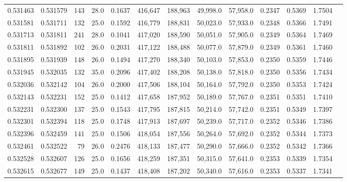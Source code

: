 \begin{tabular}{rrrrrrrrrrrrr}
0.531463 & 0.531579 &   143 & 28.0 &                                     0.1637 & 416,647 & 188,963 &  49,998.0 &  57,958.0 & 0.2347 & 0.5369 & 1.7504 \\
0.531581 & 0.531711 &   132 & 25.0 &                                     0.1592 & 416,779 & 188,831 &  50,023.0 &  57,933.0 & 0.2348 & 0.5366 & 1.7491 \\
0.531713 & 0.531811 &   241 & 28.0 &                                     0.1041 & 417,020 & 188,590 &  50,051.0 &  57,905.0 & 0.2349 & 0.5364 & 1.7469 \\
0.531811 & 0.531892 &   102 & 26.0 &                                     0.2031 & 417,122 & 188,488 &  50,077.0 &  57,879.0 & 0.2349 & 0.5361 & 1.7460 \\
0.531895 & 0.531939 &   148 & 26.0 &                                     0.1494 & 417,270 & 188,340 &  50,103.0 &  57,853.0 & 0.2350 & 0.5359 & 1.7446 \\
0.531945 & 0.532035 &   132 & 35.0 &                                     0.2096 & 417,402 & 188,208 &  50,138.0 &  57,818.0 & 0.2350 & 0.5356 & 1.7434 \\
0.532036 & 0.532142 &   104 & 26.0 &                                     0.2000 & 417,506 & 188,104 &  50,164.0 &  57,792.0 & 0.2350 & 0.5353 & 1.7424 \\
0.532143 & 0.532231 &   152 & 25.0 &                                     0.1412 & 417,658 & 187,952 &  50,189.0 &  57,767.0 & 0.2351 & 0.5351 & 1.7410 \\
0.532231 & 0.532300 &   137 & 25.0 &                                     0.1543 & 417,795 & 187,815 &  50,214.0 &  57,742.0 & 0.2351 & 0.5349 & 1.7397 \\
0.532301 & 0.532394 &   118 & 25.0 &                                     0.1748 & 417,913 & 187,697 &  50,239.0 &  57,717.0 & 0.2352 & 0.5346 & 1.7386 \\
0.532396 & 0.532459 &   141 & 25.0 &                                     0.1506 & 418,054 & 187,556 &  50,264.0 &  57,692.0 & 0.2352 & 0.5344 & 1.7373 \\
0.532461 & 0.532522 &    79 & 26.0 &                                     0.2476 & 418,133 & 187,477 &  50,290.0 &  57,666.0 & 0.2352 & 0.5342 & 1.7366 \\
0.532528 & 0.532607 &   126 & 25.0 &                                     0.1656 & 418,259 & 187,351 &  50,315.0 &  57,641.0 & 0.2353 & 0.5339 & 1.7354 \\
0.532615 & 0.532677 &   149 & 25.0 &                                     0.1437 & 418,408 & 187,202 &  50,340.0 &  57,616.0 & 0.2353 & 0.5337 & 1.7341 \\

\end{tabular}

